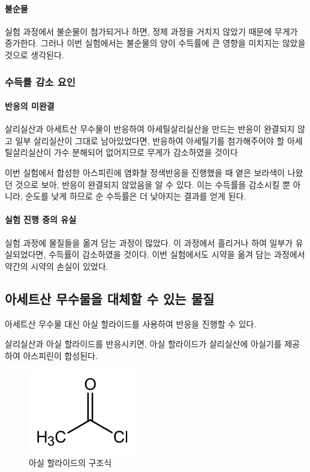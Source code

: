 \documentclass{GSHS-chemexp}
\begin{document}
	\paragraph{불순물}
	실험 과정에서 불순물이 첨가되거나 하면, 정제 과정을 거치지 않았기 때문에 무게가 증가한다. 그러나 이번 실험에서는 불순물의 양이 수득률에 큰 영향을 미치지는 않았을 것으로 생각된다.
	
	\subsubsection{수득률 감소 요인}
	
	\paragraph{반응의 미완결}
	살리실산과 아세트산 무수물이 반응하여 아세틸살리실산을 만드는 반응이
	완결되지 않고 일부 살리실산이 그대로 남아있었다면,
	반응하여 아세틸기를 첨가해주어야 할 아세틸살리실산이 가수 분해되어
	없어지므로 무게가 감소하였을 것이다
	
	이번 실험에서 합성한 아스피린에 염화철 정색반응을 진행했을 때
	옅은 보라색이 나왔던 것으로 보아, 반응이 완결되지 않았음을 알 수 있다.
	이는 수득률을 감소시킬 뿐 아니라, 순도를 낮게 하므로
	순 수득률은 더 낮아지는 결과를 얻게 된다.
	
	\paragraph{실험 진행 중의 유실}
	실험 과정에 물질들을 옮겨 담는 과정이 많았다.
	이 과정에서 흘리거나 하여 일부가 유실되었다면,
	수득률이 감소하였을 것이다. 이번 실험에서도 시약을 옮겨 담는 과정에서
	약간의 시약의 손실이 있었다.
	
	\subsection{아세트산 무수물을 대체할 수 있는 물질}
	아세트산 무수물 대신 아실 할라이드를 사용하여
	반응을 진행할 수 있다.
	
	살리실산과 아실 할라이드를 반응시키면,
	아실 할라이드가 살리실산에 아실기를 제공하여 아스피린이 합성된다.
	\begin{figure}[H]
		\centering
		\includegraphics[height=10em]{Acetyl_chloride.png}
		\caption{아실 할라이드의 구조식}
		\label{fig:acyl_hal}
	\end{figure}
	
\end{document}
